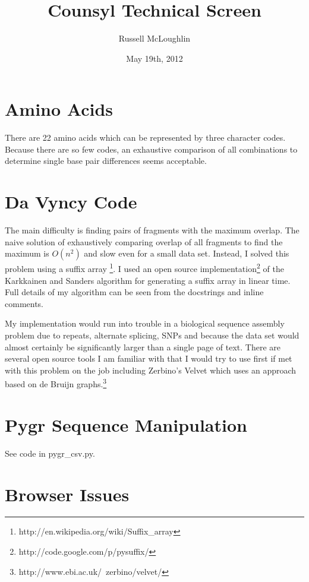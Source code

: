 \documentclass[12pt]{amsart}
\title{Counsyl Technical Screen}
\author{Russell McLoughlin}
\date{May 19th, 2012}
\begin{document}
\maketitle

\section{Amino Acids}

There are 22 amino acids which can be represented by three character codes. Because there are so few codes, an exhaustive comparison of all combinations to determine single base pair differences seems acceptable.

\section{Da Vyncy Code}

The main difficulty is finding pairs of fragments with the maximum overlap. The naive solution of exhaustively comparing overlap of all fragments to find the maximum is $O(n^2)$ and slow even for a small data set. Instead, I solved this problem using a suffix array \footnote[1]{http://en.wikipedia.org/wiki/Suffix\_array}. I used an open source implementation\footnote[2]{http://code.google.com/p/pysuffix/} of the Karkkainen and Sanders algorithm for generating a suffix array in linear time. Full details of my algorithm can be seen from the docstrings and inline comments. 

My implementation would run into trouble in a biological sequence assembly problem due to repeats, alternate splicing, SNPs and because the data set would almost certainly be significantly larger than a single page of text. There are several open source tools I am familiar with that I would try to use first if met with this problem on the job including Zerbino's Velvet which uses an approach based on de Bruijn graphs.\footnote[3]{http://www.ebi.ac.uk/~zerbino/velvet/}

\section{Pygr Sequence Manipulation}

See code in pygr\_csv.py.

\section{Browser Issues}
\end{document}
